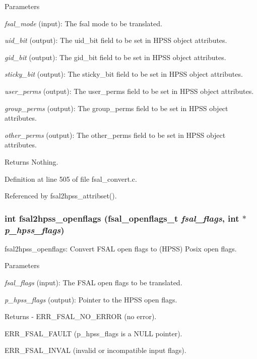 \begin{DoxyParams}{Parameters}
\item[{\em fsal\_\-mode}](input): The fsal mode to be translated. \item[{\em uid\_\-bit}](output): The uid\_\-bit field to be set in HPSS object attributes. \item[{\em gid\_\-bit}](output): The gid\_\-bit field to be set in HPSS object attributes. \item[{\em sticky\_\-bit}](output): The sticky\_\-bit field to be set in HPSS object attributes. \item[{\em user\_\-perms}](output): The user\_\-perms field to be set in HPSS object attributes. \item[{\em group\_\-perms}](output): The group\_\-perms field to be set in HPSS object attributes. \item[{\em other\_\-perms}](output): The other\_\-perms field to be set in HPSS object attributes.\end{DoxyParams}
\begin{DoxyReturn}{Returns}
Nothing. 
\end{DoxyReturn}


Definition at line 505 of file fsal\_\-convert.c.

Referenced by fsal2hpss\_\-attribset().
\subsubsection[{fsal2hpss\_\-openflags}]{\setlength{\rightskip}{0pt plus 5cm}int fsal2hpss\_\-openflags (fsal\_\-openflags\_\-t {\em fsal\_\-flags}, \/  int $\ast$ {\em p\_\-hpss\_\-flags})}\label{fsal__convert_8c_a835aedeac0e6677dcef16b69e42e2cde}
fsal2hpss\_\-openflags: Convert FSAL open flags to (HPSS) Posix open flags.


\begin{DoxyParams}{Parameters}
\item[{\em fsal\_\-flags}](input): The FSAL open flags to be translated. \item[{\em p\_\-hpss\_\-flags}](output): Pointer to the HPSS open flags.\end{DoxyParams}
\begin{DoxyReturn}{Returns}
-\/ ERR\_\-FSAL\_\-NO\_\-ERROR (no error).
\begin{DoxyItemize}
\item ERR\_\-FSAL\_\-FAULT (p\_\-hpss\_\-flags is a NULL pointer).
\item ERR\_\-FSAL\_\-INVAL (invalid or incompatible input flags). 
\end{DoxyItemize}
\end{DoxyReturn}



